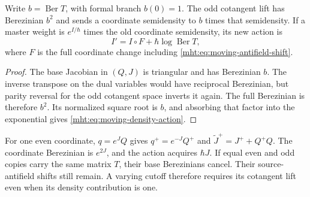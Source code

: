\begin{proposition}\label{mht:prop:moving-semidensity}
Write $b=\operatorname{Ber}T$, with formal branch $b(0)=1$.
The odd cotangent lift has Berezinian $b^2$ and sends a coordinate
semidensity to $b$ times that semidensity. If a master weight is
$e^{I/\hbar}$ times the old coordinate semidensity, its new action is
\begin{equation}\label{mht:eq:moving-density-action}
 I'=I\circ F+\hbar\log\operatorname{Ber}T,
\end{equation}
where $F$ is the full coordinate change including
\eqref{mht:eq:moving-antifield-shift}.
\end{proposition}

\begin{proof}
The base Jacobian in $(Q,J)$ is triangular and has Berezinian $b$.
The inverse transpose on the dual variables would have reciprocal
Berezinian, but parity reversal for the odd cotangent space inverts
it again. The full Berezinian is therefore $b^2$. Its normalized
square root is $b$, and absorbing that factor into the exponential
gives \eqref{mht:eq:moving-density-action}.
\end{proof}

For one even coordinate, $q=e^JQ$ gives $q^+=e^{-J}Q^+$ and
$\widetilde J^+=J^++Q^+Q$. The coordinate Berezinian is $e^{2J}$,
and the action acquires $\hbar J$. If equal even and odd copies
carry the same matrix $T$, their base Berezinians cancel. Their
source-antifield shifts still remain. A varying cutoff therefore
requires its cotangent lift even when its density contribution is one.
